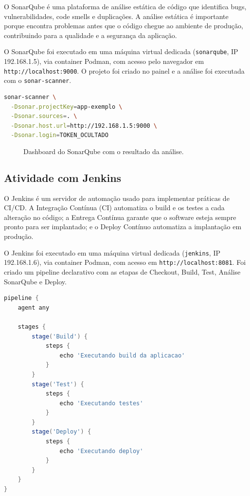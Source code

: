 \documentclass[12pt,a4paper]{article}
\begin{document}
O SonarQube \'e uma plataforma de an\'alise est\'atica de c\'odigo que identifica
bugs, vulnerabilidades, code smells e duplica\c{c}\~oes. A an\'alise est\'atica
\'e importante porque encontra problemas antes que o c\'odigo chegue ao ambiente
de produ\c{c}\~ao, contribuindo para a qualidade e a seguran\c{c}a da aplica\c{c}\~ao.

O SonarQube foi executado em uma m\'aquina virtual dedicada
(\texttt{sonarqube}, IP 192.168.1.5), via container Podman, com acesso pelo
navegador em \texttt{http://localhost:9000}. O projeto foi criado no painel e a
an\'alise foi executada com o \texttt{sonar-scanner}.

\begin{lstlisting}[language=bash,caption={Comando do sonar-scanner}]
sonar-scanner \
  -Dsonar.projectKey=app-exemplo \
  -Dsonar.sources=. \
  -Dsonar.host.url=http://192.168.1.5:9000 \
  -Dsonar.login=TOKEN_OCULTADO
\end{lstlisting}

\begin{figure}[htbp]
  \centering
  \caption{Dashboard do SonarQube com o resultado da an\'alise.}
\end{figure}

\subsection{Atividade com Jenkins}

O Jenkins \'e um servidor de automa\c{c}\~ao usado para implementar pr\'aticas de
CI/CD. A Integra\c{c}\~ao Cont\'inua (CI) automatiza o build e os testes a cada
altera\c{c}\~ao no c\'odigo; a Entrega Cont\'inua garante que o software esteja
sempre pronto para ser implantado; e o Deploy Cont\'inuo automatiza a implanta\c{c}\~ao
em produ\c{c}\~ao.

O Jenkins foi executado em uma m\'aquina virtual dedicada (\texttt{jenkins}, IP
192.168.1.6), via container Podman, com acesso em \texttt{http://localhost:8081}.
Foi criado um pipeline declarativo com as etapas de Checkout, Build, Test,
An\'alise SonarQube e Deploy.

\begin{lstlisting}[language=Groovy,caption={Trecho do Jenkinsfile}]
pipeline {
    agent any

    stages {
        stage('Build') {
            steps {
                echo 'Executando build da aplicacao'
            }
        }
        stage('Test') {
            steps {
                echo 'Executando testes'
            }
        }
        stage('Deploy') {
            steps {
                echo 'Executando deploy'
            }
        }
    }
}
\end{lstlisting}
\end{document}
